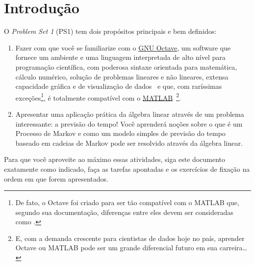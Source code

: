 \section{Introdução}
\label{sec:introd}

O \emph{Problem Set 1} (PS1) tem dois propósitos principais e bem
definidos:

\begin{enumerate}
\item Fazer com que você se
familiarize com o \href{https://www.gnu.org/software/octave/}{GNU Octave}, um
software que fornece um ambiente e uma linguagem interpretada de alto nível para
programação científica, com poderosa sintaxe orientada para matemática, cálculo
numérico, solução de problemas lineares e não lineares, extensa capacidade
gráfica e de visualização de dados~\citep{octave} e que, com raríssimas
exceções\footnote{De fato, o Octave foi criado para ser tão compatível com o
MATLAB que, segundo sua documentação, diferenças entre eles devem ser
consideradas como .},
é totalmente compatível com o 
\href{https://www.mathworks.com/products/matlab.html}{MATLAB}~\citep{matlab2019a}\footnote{E, com a
demanda crescente para cientistas de dados hoje no país, aprender Octave ou
MATLAB pode ser um grande diferencial futuro em sua carreira\ldots}.

\item Apresentar uma aplicação prática da álgebra linear através
de um problema interessante: a previsão do tempo! Você aprenderá noções sobre o
que é um Processo de Markov e como um modelo simples de previsão do tempo
baseado em cadeias de Markov pode ser resolvido através da álgebra linear.
\end{enumerate}

Para que você aproveite ao máximo essas atividades, siga este documento exatamente
como indicado, faça as tarefas apontadas e os exercícios de fixação na ordem
em que forem apresentados.

